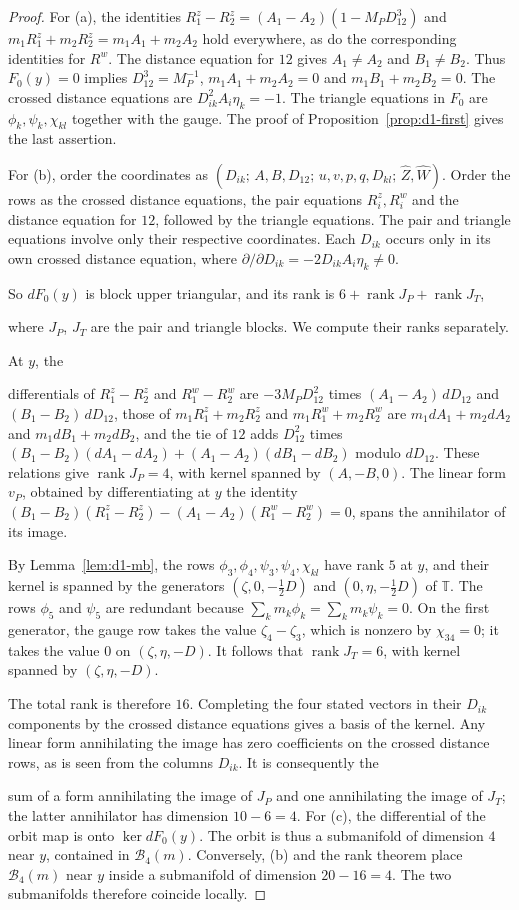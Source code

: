 \documentclass[11pt]{amsart}
\theoremstyle{definition}
\theoremstyle{remark}
\begin{document}
\begin{proof}
{For (a), the identities $R^z_1-R^z_2=(A_1-A_2)(1-M_PD_{12}^3)$ and
$m_1R^z_1+m_2R^z_2=m_1A_1+m_2A_2$ hold everywhere, as do the corresponding identities for
$R^w$. The distance equation for $12$ gives $A_1\ne A_2$ and $B_1\ne B_2$.
Thus $F_0(y)=0$ implies $D_{12}^3=M_P^{-1}$, $m_1A_1+m_2A_2=0$ and $m_1B_1+m_2B_2=0$.
The crossed distance equations are $D_{ik}^2A_i\eta_k=-1$.
The triangle equations in $F_0$ are $\phi_k,\psi_k,\chi_{kl}$ together with the gauge.
The proof of Proposition~\ref{prop:d1-first} gives the last assertion.

For (b), order the coordinates as $(D_{ik};\,A,B,D_{12};\,u,v,p,q,D_{kl};\,\hat Z,\hat W)$.
Order the rows as the crossed distance equations, the pair equations $R^z_i,R^w_i$
and the distance equation for $12$, followed by the triangle equations.
The pair and triangle equations involve only their respective coordinates.
Each $D_{ik}$ occurs only in its own crossed distance equation, where
$\partial/\partial D_{ik}=-2D_{ik}A_i\eta_k\ne0$.}
{So $dF_0(y)$ is block upper triangular, and its rank is $6+\operatorname{rank}J_P+
\operatorname{rank}J_T$}, {where $J_P$, $J_T$ are the pair and triangle blocks.
We compute their ranks separately.

At $y$, the}
differentials of $R^z_1-R^z_2$ and $R^w_1-R^w_2$ are $-3M_PD_{12}^2$ times
$(A_1-A_2)\,dD_{12}$ and $(B_1-B_2)\,dD_{12}$, those of $m_1R^z_1+m_2R^z_2$ and $m_1R^w_1+m_2R^w_2$
are $m_1dA_1+m_2dA_2$ and $m_1dB_1+m_2dB_2$, and the tie of $12$ adds $D_{12}^2$ times
$(B_1-B_2)(dA_1-dA_2)+(A_1-A_2)(dB_1-dB_2)$ modulo $dD_{12}$.
{These relations give $\operatorname{rank}J_P=4$, with kernel spanned by
$(A,-B,0)$. The linear form $v_P$, obtained by differentiating at $y$ the identity}
{$(B_1-B_2)(R^z_1-R^z_2)-(A_1-A_2)(R^w_1-R^w_2)=0$, spans the annihilator of its image.}

{By Lemma~\ref{lem:d1-mb}, the rows $\phi_3,\phi_4,\psi_3,\psi_4,\chi_{kl}$ have rank $5$
at $y$, and their kernel is spanned by the generators $(\zeta,0,-\frac12D)$ and
$(0,\eta,-\frac12D)$ of $\mathbb T$.
The rows $\phi_5$ and $\psi_5$ are redundant because $\sum_km_k\phi_k=\sum_km_k\psi_k=0$.
On the first generator, the gauge row takes the value $\zeta_4-\zeta_3$,
which is nonzero by $\chi_{34}=0$; it takes the value $0$ on $(\zeta,\eta,-D)$.
It follows that $\operatorname{rank}J_T=6$, with kernel spanned by $(\zeta,\eta,-D)$.

The total rank is therefore $16$. Completing the four stated vectors in their $D_{ik}$
components by the crossed distance equations gives a basis of the kernel.
Any linear form annihilating the image has zero coefficients on the crossed distance rows,
as is seen from the columns $D_{ik}$. It is consequently the}
{sum of a form annihilating the image of $J_P$ and one annihilating the image of $J_T$;
the latter annihilator has dimension $10-6=4$.}
{For (c), the differential of the orbit map is onto $\ker dF_0(y)$.
The orbit is thus a submanifold of dimension $4$ near $y$, contained in $\mathcal B_4(m)$.
Conversely, (b) and the rank theorem place $\mathcal B_4(m)$ near $y$ inside a submanifold
of dimension $20-16=4$. The two submanifolds therefore coincide locally.}
\end{proof}
\end{document}
